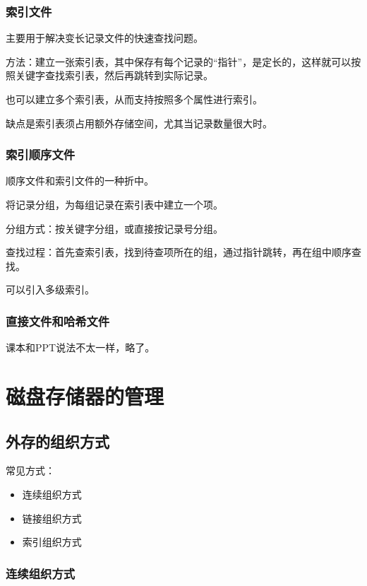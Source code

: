 \documentclass[12pt, a4paper, oneside]{ctexart}
\begin{document}
\subsubsection{索引文件}

主要用于解决变长记录文件的快速查找问题。

方法：建立一张索引表，其中保存有每个记录的“指针”，是定长的，这样就可以按照关键字查找索引表，然后再跳转到实际记录。

也可以建立多个索引表，从而支持按照多个属性进行索引。

缺点是索引表须占用额外存储空间，尤其当记录数量很大时。

\subsubsection{索引顺序文件}

顺序文件和索引文件的一种折中。

将记录分组，为每组记录在索引表中建立一个项。

分组方式：按关键字分组，或直接按记录号分组。

查找过程：首先查索引表，找到待查项所在的组，通过指针跳转，再在组中顺序查找。

可以引入多级索引。

\subsubsection{直接文件和哈希文件}

课本和PPT说法不太一样，略了。

\newpage
\section{磁盘存储器的管理}

\subsection{外存的组织方式}

常见方式：
\begin{itemize}
    \item 连续组织方式
    \item 链接组织方式
    \item 索引组织方式
\end{itemize}

\subsubsection{连续组织方式}
\end{document}
